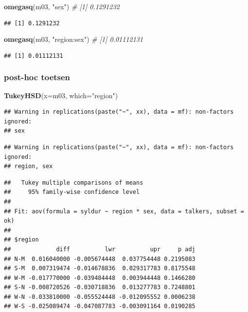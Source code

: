 \documentclass[
]{book}
\newenvironment{Shaded}{\begin{snugshade}}{\end{snugshade}}
\newcommand{\CommentTok}[1]{\textcolor[rgb]{0.56,0.35,0.01}{\textit{#1}}}
\newcommand{\DataTypeTok}[1]{\textcolor[rgb]{0.13,0.29,0.53}{#1}}
\newcommand{\KeywordTok}[1]{\textcolor[rgb]{0.13,0.29,0.53}{\textbf{#1}}}
\newcommand{\NormalTok}[1]{#1}
\newcommand{\StringTok}[1]{\textcolor[rgb]{0.31,0.60,0.02}{#1}}
\begin{document}
\begin{Shaded}
\begin{Highlighting}[]
\KeywordTok{omegasq}\NormalTok{(m03, }\StringTok{"sex"}\NormalTok{)         }\CommentTok{\# [1] 0.1291232}
\end{Highlighting}
\end{Shaded}

\begin{verbatim}
## [1] 0.1291232
\end{verbatim}

\begin{Shaded}
\begin{Highlighting}[]
\KeywordTok{omegasq}\NormalTok{(m03, }\StringTok{"region:sex"}\NormalTok{)  }\CommentTok{\# [1] 0.01112131}
\end{Highlighting}
\end{Shaded}

\begin{verbatim}
## [1] 0.01112131
\end{verbatim}

\hypertarget{post-hoc-toetsen}{%
\subsubsection{post-hoc toetsen}\label{post-hoc-toetsen}}

\begin{Shaded}
\begin{Highlighting}[]
\KeywordTok{TukeyHSD}\NormalTok{(}\DataTypeTok{x=}\NormalTok{m03, }\DataTypeTok{which=}\StringTok{"region"}\NormalTok{)}
\end{Highlighting}
\end{Shaded}

\begin{verbatim}
## Warning in replications(paste("~", xx), data = mf): non-factors ignored:
## sex
\end{verbatim}

\begin{verbatim}
## Warning in replications(paste("~", xx), data = mf): non-factors ignored:
## region, sex
\end{verbatim}

\begin{verbatim}
##   Tukey multiple comparisons of means
##     95% family-wise confidence level
## 
## Fit: aov(formula = syldur ~ region * sex, data = talkers, subset = ok)
## 
## $region
##             diff          lwr          upr     p adj
## N-M  0.016040000 -0.005674448  0.037754448 0.2195083
## S-M  0.007319474 -0.014678836  0.029317783 0.8175548
## W-M -0.017770000 -0.039484448  0.003944448 0.1466280
## S-N -0.008720526 -0.030718836  0.013277783 0.7248801
## W-N -0.033810000 -0.055524448 -0.012095552 0.0006238
## W-S -0.025089474 -0.047087783 -0.003091164 0.0190285
\end{verbatim}
\end{document}
